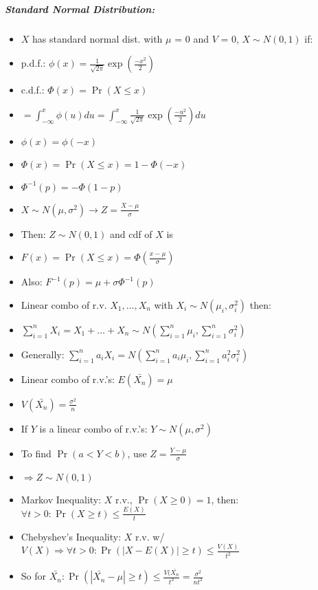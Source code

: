 \documentclass[landscape,10pt]{article}
\begin{document}
\begin{multicols}{4}
\subparagraph*{Standard Normal Distribution:}
\begin{itemize}
    \item[] \(X\) has standard normal dist. with \(\mu\) = 0 and \(V\) = 0, \(X \sim N(0,1)\) if:
    \item[] p.d.f.: \( \phi(x) = \frac{1}{\sqrt{2 \pi}}\exp\left (\frac{-x^2}{2}\right)\)
    \item[] c.d.f.: \( 
        \Phi(x) = \Pr(X \leq x) \)
    \item[] \(= \int_{-\infty}^{x}{\phi(u)du}= \int_{-\infty}^{x}{\frac{1}{\sqrt{2 \pi}} \exp\left(\frac{-u^2}{2}\right)du}\)
    \item[] \(\phi(x) = \phi(-x)\)
    \item[] \(\Phi(x) = \Pr(X \leq x) = 1 - \Phi(-x)\)
    \item[] \(\Phi^{-1}(p) = -\Phi(1-p)\)
    \item[] \(X \sim N(\mu, \sigma^2) \rightarrow Z = \frac{X-\mu}{\sigma}\)
    \item[] Then: \(Z \sim N(0,1)\) and cdf of \(X\) is
    \item[] \(F(x) = \Pr(X \leq x) = \Phi(\frac{x-\mu}{\sigma})\)
    \item[] Also: \(F^{-1}(p) = \mu + \sigma \Phi^{-1}(p)\)
    \item[] Linear combo of r.v. \(X_1, \ldots, X_n\) with \(X_i \sim N(\mu_i, \sigma_i^2)\) then:
    \item[] \(\sum\limits_{i = 1}^{n}{X_i} = X_1 + \ldots + X_n \sim N(\sum\limits_{i = 1}^{n} \mu_i, \sum\limits_{i = 1}^{n} \sigma_i^2)\)
    \item[] Generally: \(\sum\limits_{i = 1}^{n}{a_i X_i} = N(\sum\limits_{i = 1}^{n}{a_i \mu_i}, \sum\limits_{i = 1}^{n}{a_i^2 \sigma_i^2})\)
    \item[] Linear combo of r.v.'s: \(E(\bar{X_n}) =  \mu\)
    \item[] \(V(\bar{X_n}) = \frac{\sigma^2}{n}\)
    \item[] If \(Y\) is a linear combo of r.v.'s: \(Y \sim N(\mu, \sigma^2)\)
    \item[] To find \(\Pr(a < Y < b)\), use \(Z = \frac{Y-\mu}{\sigma}\)
    \item[] \(\Rightarrow Z \sim N(0,1)\)
    \item[] Markov Inequality: \(X\) r.v., \(\Pr(X \geq 0) = 1\), then: \(\forall t > 0: \Pr(X \geq t) \leq \frac{E(X)}{t}\)
    \item[] Chebyshev's Inequality: \(X\) r.v. w/ \(V(X) \Rightarrow \forall t > 0: \Pr(|X - E(X)| \geq t) \leq \frac{V(X)}{t^2}\)
    \item[] So for \(\bar{X_n}: \Pr(|\bar{X_n} - \mu|\geq t) \leq \frac{V(\bar{X_n}}{t^2} = \frac{\sigma^2}{nt^2}\)
\end{itemize}


\end{multicols}
\end{document}
